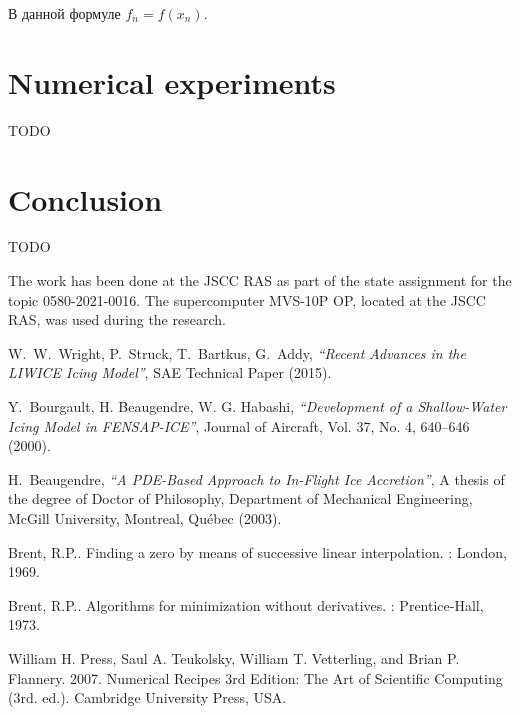\documentclass[
11pt,%
tightenlines,%
twoside,%
onecolumn,%
nofloats,%
nobibnotes,%
nofootinbib,%
superscriptaddress,%
noshowpacs,%
centertags]%
{revtex4}
\begin{document}
В данной формуле $f_n=f(x_n)$.

\section{Numerical experiments}

TODO

\section{Conclusion}

TODO

\begin{acknowledgments}
The work has been done at the JSCC RAS as part of the state assignment for the topic 0580-2021-0016.
The supercomputer MVS-10P OP, located at the JSCC RAS, was used during the research.
\end{acknowledgments}

\begin{thebibliography}{99}

W.~W.~Wright, P.~Struck, T.~Bartkus, G.~Addy, {\it ``Recent Advances in the LIWICE Icing Model''}, SAE Technical Paper (2015).

Y.~Bourgault, H. Beaugendre, W. G. Habashi, {\it ``Development of a Shallow-Water Icing Model in FENSAP-ICE''}, Journal of Aircraft, Vol. 37, No. 4, 640--646 (2000).

H.~Beaugendre, {\it ``A PDE-Based Approach to In-Flight Ice Accretion''}, A thesis of the degree of Doctor of Philosophy, Department of Mechanical Engineering, McGill University, Montreal, Qu\'ebec (2003).

Brent, R.P.. Finding a zero by means of successive linear interpolation. : London, 1969.

Brent, R.P.. Algorithms for minimization without derivatives. : Prentice-Hall, 1973.

William H. Press, Saul A. Teukolsky, William T. Vetterling, and Brian P. Flannery. 2007. Numerical Recipes 3rd Edition: The Art of Scientific Computing (3rd. ed.). Cambridge University Press, USA.


\end{thebibliography}
\end{document}
